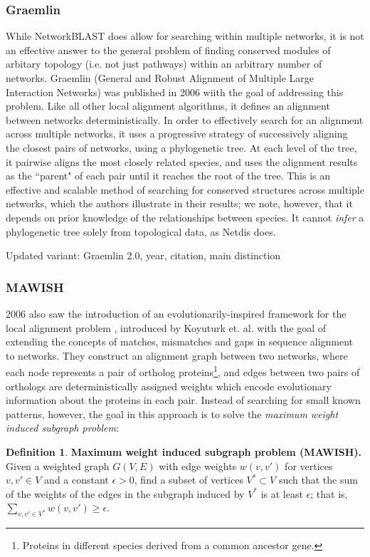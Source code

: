 \documentclass[12pt]{thesis}
\theoremstyle{plain}
\theoremstyle{definition}
\newtheorem{definition}[theorem]{Definition}
\theoremstyle{remark}
\begin{document}
\subsubsection{Graemlin} While NetworkBLAST does allow for searching within multiple networks, it is not an effective answer to the general problem of finding conserved modules of arbitary topology (i.e. not just pathways) within an arbitrary number of networks. Graemlin (General and Robust Alignment of Multiple Large Interaction Networks) \cite{flannick2006graemlin} was published in 2006 wiith the goal of addressing this problem. Like all other local alignment algorithms, it defines an alignment between networks deterministically. In order to effectively search for an alignment across multiple networks, it uses a progressive strategy of successively aligning the closest pairs of networks, using a phylogenetic tree. At each level of the tree, it pairwise aligns the most closely related species, and uses the alignment results as the ``parent" of each pair until it reaches the root of the tree. This is an effective and scalable method of searching for conserved structures across multiple networks, which the authors illustrate in their results; we note, however, that it depends on prior knowledge of the relationships between species. It cannot \textit{infer} a phylogenetic tree solely from topological data, as Netdis does.

Updated variant: Graemlin 2.0, year, citation, main distinction

\subsubsection{MAWISH} 2006 also saw the introduction of an evolutionarily-inspired framework for the local alignment problem \cite{Koyuturk_2006}, introduced by Koyuturk et. al. with the goal of extending the concepts of matches, mismatches and gaps in sequence alignment to networks. They construct an alignment graph between two networks, where each node represents a pair of ortholog proteins\footnote{Proteins in different species derived from a common ancestor gene.}, and edges between two pairs of orthologs are deterministically assigned weights which encode evolutionary information about the proteins in each pair. Instead of searching for small known patterns, however, the goal in this approach is to solve the \textit{maximum weight induced subgraph problem}:

\begin{definition}\textbf{Maximum weight induced subgraph problem (MAWISH).}
Given a weighted graph $G(V,E)$ with edge weights $w(v,v')$ for vertices $v,v'\in V$ and a constant $\epsilon>0$, find a subset of vertices $V^*\subset V$ such that the sum of the weights of the edges in the subgraph induced by $V^*$ is at least $\epsilon$; that is, $\sum_{v,v'\in V^*} w(v,v') \geq \epsilon$.
\end{definition}
\end{document}
